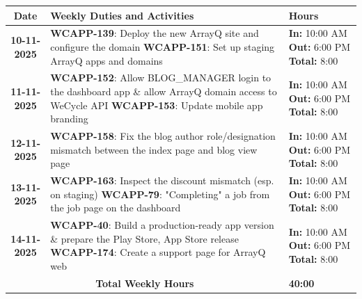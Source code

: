 \documentclass[a4paper,11pt]{article}
\begin{document}
\begin{tabularx}{\textwidth}{|c|>{\raggedright\arraybackslash}X|>{\centering\arraybackslash}m{3.5cm}|}
\hline
\rowcolor{gray!30}
\textbf{Date} & \textbf{Weekly Duties and Activities} & \textbf{Hours} \\
\hline
\textbf{10-11-2025} & \textbf{WCAPP-139}: Deploy the new ArrayQ site and configure the domain \newline \textbf{WCAPP-151}: Set up staging ArrayQ apps and domains & \textbf{In:} 10:00 AM \newline \textbf{Out:} 6:00 PM \newline \textbf{Total:} 8:00 \\
\hline
\textbf{11-11-2025} & \textbf{WCAPP-152}: Allow BLOG\_MANAGER login to the dashboard app \& allow ArrayQ domain access to WeCycle API \newline \textbf{WCAPP-153}: Update mobile app branding & \textbf{In:} 10:00 AM \newline \textbf{Out:} 6:00 PM \newline \textbf{Total:} 8:00 \\
\hline
\textbf{12-11-2025} & \textbf{WCAPP-158}: Fix the blog author role/designation mismatch between the index page and blog view page & \textbf{In:} 10:00 AM \newline \textbf{Out:} 6:00 PM \newline \textbf{Total:} 8:00 \\
\hline
\textbf{13-11-2025} & \textbf{WCAPP-163}: Inspect the discount mismatch (esp. on staging) \newline \textbf{WCAPP-79}: "Completing" a job from the job page on the dashboard & \textbf{In:} 10:00 AM \newline \textbf{Out:} 6:00 PM \newline \textbf{Total:} 8:00 \\
\hline
\textbf{14-11-2025} & \textbf{WCAPP-40}: Build a production-ready app version \& prepare the Play Store, App Store release \newline \textbf{WCAPP-174}: Create a support page for ArrayQ web & \textbf{In:} 10:00 AM \newline \textbf{Out:} 6:00 PM \newline \textbf{Total:} 8:00 \\
\hline
\multicolumn{2}{|c|}{\textbf{Total Weekly Hours}} & \textbf{40:00} \\
\hline
\end{tabularx}

\vspace{3em}
\end{document}
